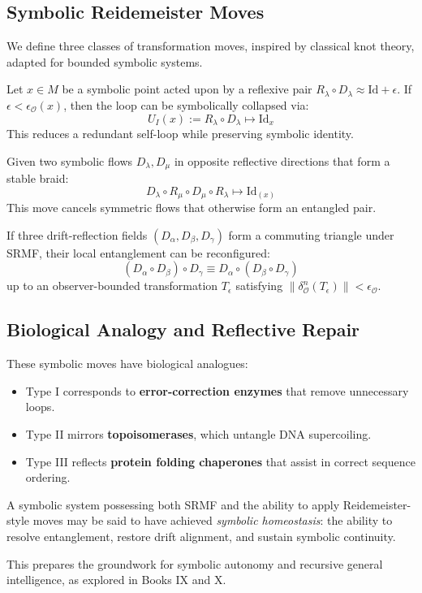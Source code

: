 \subsection{Symbolic Reidemeister Moves}
\label{subsection:bk8_module_braid_topology}
We define three classes of transformation moves, inspired by classical knot theory, adapted for bounded symbolic systems.
\begin{proposition}
\label{prop:bk8_membrane_identity_collapse}
Let \( x \in M \) be a symbolic point acted upon by a reflexive pair \( R_\lambda \circ D_\lambda \approx \text{Id} + \epsilon \). If \( \epsilon < \epsilon_\mathcal{O}(x) \), then the loop can be symbolically collapsed via:
\[
U_I(x) := R_\lambda \circ D_\lambda \mapsto \text{Id}_x
\]
This reduces a redundant self-loop while preserving symbolic identity.
\end{proposition}
\begin{proposition}
\label{prop:bk8_observer_frame_invariance}
Given two symbolic flows \( D_\lambda, D_\mu \) in opposite reflective directions that form a stable braid:
\[
D_\lambda \circ R_\mu \circ D_\mu \circ R_\lambda \mapsto \text{Id}_{(x)}
\]
This move cancels symmetric flows that otherwise form an entangled pair.
\end{proposition}
\begin{proposition}
\label{prop:bk8_membrane_operator_symmetry}
If three drift-reflection fields \( (D_\alpha, D_\beta, D_\gamma) \) form a commuting triangle under SRMF, their local entanglement can be reconfigured:
\[
(D_\alpha \circ D_\beta) \circ D_\gamma \equiv D_\alpha \circ (D_\beta \circ D_\gamma)
\]
up to an observer-bounded transformation \( T_\epsilon \) satisfying \( \|\delta^n_\mathcal{O}(T_\epsilon)\| < \epsilon_\mathcal{O} \).
\end{proposition}
\subsection{Biological Analogy and Reflective Repair}
\label{subsection:bk8_symbolic_frame_shift}
These symbolic moves have biological analogues:
\begin{itemize}
  \item Type I corresponds to \textbf{error-correction enzymes} that remove unnecessary loops.
  \item Type II mirrors \textbf{topoisomerases}, which untangle DNA supercoiling.
  \item Type III reflects \textbf{protein folding chaperones} that assist in correct sequence ordering.
\end{itemize}
\begin{remark}
\label{remark:bk8_symbolic_repair_loop}
A symbolic system possessing both SRMF and the ability to apply Reidemeister-style moves may be said to have achieved \emph{symbolic homeostasis}: the ability to resolve entanglement, restore drift alignment, and sustain symbolic continuity.
\end{remark}
This prepares the groundwork for symbolic autonomy and recursive general intelligence, as explored in Books IX and X.
